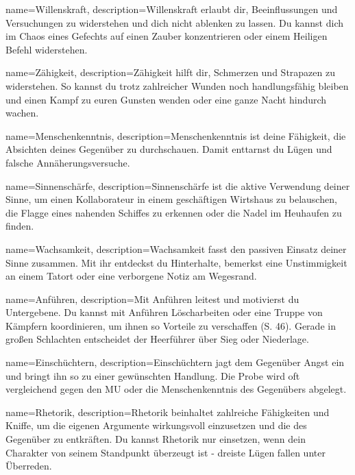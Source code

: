 {
    name={Willenskraft},
    description={Willenskraft erlaubt dir, Beeinflussungen und Versuchungen zu widerstehen und dich nicht ablenken zu lassen. Du kannst dich im Chaos eines Gefechts auf einen Zauber konzentrieren oder einem Heiligen Befehl widerstehen.}
}


{
    name={Zähigkeit},
    description={Zähigkeit hilft dir, Schmerzen und Strapazen zu widerstehen. So kannst du trotz zahlreicher Wunden noch handlungsfähig bleiben und einen Kampf zu euren Gunsten wenden oder eine ganze Nacht hindurch wachen.}
}


{
    name={Menschenkenntnis},
    description={Menschenkenntnis ist deine Fähigkeit, die Absichten deines Gegenüber zu durchschauen. Damit enttarnst du Lügen und falsche Annäherungsversuche.}
}


{
    name={Sinnenschärfe},
    description={Sinnenschärfe ist die aktive Verwendung deiner Sinne, um einen Kollaborateur in einem geschäftigen Wirtshaus zu belauschen, die Flagge eines nahenden Schiffes zu erkennen oder die Nadel im Heuhaufen zu finden.}
}


{
    name={Wachsamkeit},
    description={Wachsamkeit fasst den passiven Einsatz deiner Sinne zusammen. Mit ihr entdeckst du Hinterhalte, bemerkst eine Unstimmigkeit an einem Tatort oder eine verborgene Notiz am Wegesrand.}
}


{
    name={Anführen},
    description={Mit Anführen leitest und motivierst du Untergebene. Du kannst mit Anführen Löscharbeiten oder eine Truppe von Kämpfern koordinieren, um ihnen so Vorteile zu verschaffen (S. 46). Gerade in großen Schlachten entscheidet der Heerführer über Sieg oder Niederlage.}
}


{
    name={Einschüchtern},
    description={Einschüchtern jagt dem Gegenüber Angst ein und bringt ihn so zu einer gewünschten Handlung. Die Probe wird oft vergleichend gegen den MU oder die Menschenkenntnis des Gegenübers abgelegt.}
}


{
    name={Rhetorik},
    description={Rhetorik beinhaltet zahlreiche Fähigkeiten und Kniffe, um die eigenen Argumente wirkungsvoll einzusetzen und die des Gegenüber zu entkräften. Du kannst Rhetorik nur einsetzen, wenn dein Charakter von seinem Standpunkt überzeugt ist - dreiste Lügen fallen unter Überreden.}
}


